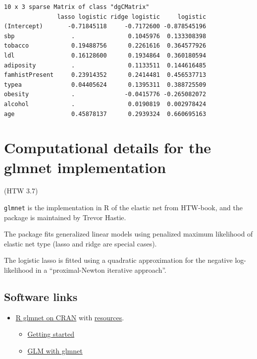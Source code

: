 \documentclass[
  letterpaper,
  DIV=11,
  numbers=noendperiod]{scrartcl}
\providecommand{\tightlist}{%
  \setlength{\itemsep}{0pt}\setlength{\parskip}{0pt}}\usepackage{longtable,booktabs,array}
\begin{document}
\begin{verbatim}
10 x 3 sparse Matrix of class "dgCMatrix"
               lasso logistic ridge logistic     logistic
(Intercept)       -0.71845118     -0.7172600 -0.878545196
sbp                .               0.1045976  0.133308398
tobacco            0.19488756      0.2261616  0.364577926
ldl                0.16128600      0.1934864  0.360180594
adiposity          .               0.1133511  0.144616485
famhistPresent     0.23914352      0.2414481  0.456537713
typea              0.04405624      0.1395311  0.388725509
obesity            .              -0.0415776 -0.265082072
alcohol            .               0.0190819  0.002978424
age                0.45878137      0.2939324  0.660695163
\end{verbatim}

\hypertarget{computational-details-for-the-glmnet-implementation}{%
\section{Computational details for the glmnet
implementation}\label{computational-details-for-the-glmnet-implementation}}

(HTW 3.7)

\texttt{glmnet} is the implementation in R of the elastic net from
HTW-book, and the package is maintained by Trevor Hastie.

The package fits generalized linear models using penalized maximum
likelihood of elastic net type (lasso and ridge are special cases).

The logistic lasso is fitted using a quadratic approximation for the
negative log-likelihood in a ``proximal-Newton iterative approach''.

\hypertarget{software-links}{%
\subsection{Software links}\label{software-links}}

\begin{itemize}
\tightlist
\item
  \href{https://cran.r-project.org/web/packages/glmnet/index.html}{R
  glmnet on CRAN} with
  \href{http://www.stanford.edu/~hastie/glmnet}{resources}.

  \begin{itemize}
  \tightlist
  \item
    \href{https://glmnet.stanford.edu/articles/glmnet.html}{Getting
    started}
  \item
    \href{https://glmnet.stanford.edu/articles/glmnetFamily.html}{GLM
    with glmnet}
  \end{itemize}
\end{itemize}
\end{document}
